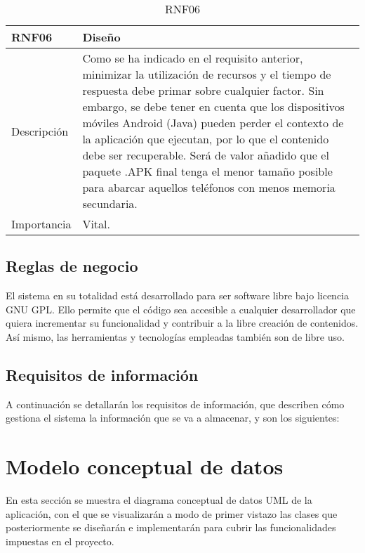 \begin{table}[H]
\label{RNF06}
\begin{center}
\begin{tabular}{| l | p{10cm} |}
\hline
RNF06 & Diseño\\
\hline
Descripción & Como se ha indicado en el requisito anterior, minimizar la utilización de recursos y el tiempo de respuesta debe primar sobre cualquier factor. Sin embargo, se debe tener en cuenta que los dispositivos móviles Android (Java) pueden perder el contexto de la aplicación que ejecutan, por lo que el contenido debe ser recuperable. Será de valor añadido que el paquete .APK final tenga el menor tamaño posible para abarcar aquellos teléfonos con menos memoria secundaria.\\
\hline
Importancia & Vital.\\
\hline
\end{tabular}
\end{center}
\caption{RNF06}
\end{table}

\subsection{Reglas de negocio}

El sistema en su totalidad está desarrollado para ser software libre bajo licencia GNU GPL. Ello permite que el código sea accesible a cualquier desarrollador que quiera incrementar su funcionalidad y contribuir a la libre creación de contenidos. Así mismo, las herramientas y tecnologías empleadas también son de libre uso.

\subsection{Requisitos de información}

A continuación se detallarán los requisitos de información, que describen cómo gestiona el sistema la información que se va a almacenar, y son los siguientes:

\section{Modelo conceptual de datos}

En esta sección se muestra el diagrama conceptual de datos UML de la aplicación, con el que se visualizarán a modo de primer vistazo las clases que posteriormente se diseñarán e implementarán para cubrir las funcionalidades impuestas en el proyecto.\\

